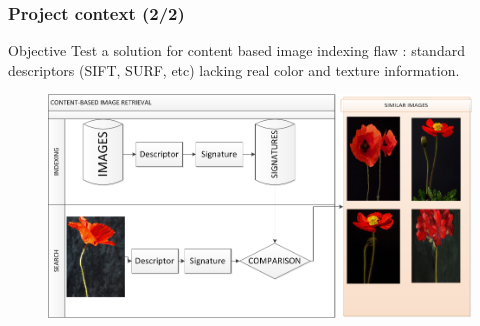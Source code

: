 \documentclass[xcolor=table]{beamer}
\begin{document}
\begin{frame} \frametitle{Project context (2/2)}
\begin{block}{Objective}
  Test a solution for content based image indexing flaw : standard descriptors (SIFT, SURF, etc) lacking real color and texture information.
\end{block}
	
\begin{figure}
	\includegraphics[scale=0.38]{CBIR.png}
\end{figure}

\end{frame}


\end{document}
